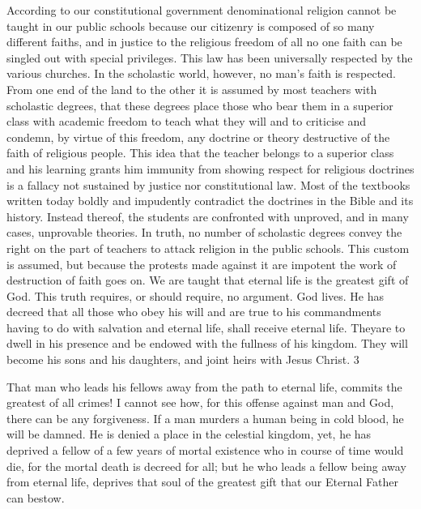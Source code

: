 According to our constitutional government denominational religion cannot be taught in our
public schools because our citizenry is composed of so many different faiths, and in justice to
the religious freedom of all no one faith can be singled out with special privileges. This law
has been universally respected by the various churches. In the scholastic world, however, no
man's faith is respected. From one end of the land to the other it is assumed by most teachers
with scholastic degrees, that these degrees place those who bear them in a superior class with
academic freedom to teach what they will and to criticise and condemn, by virtue of this
freedom, any doctrine or theory destructive of the faith of religious people. This idea that the
teacher belongs to a superior class and his learning grants him immunity from showing
respect for religious doctrines is a fallacy not sustained by justice nor constitutional law.
Most of the textbooks written today boldly and impudently contradict the doctrines in the
Bible and its history. Instead thereof, the students are confronted with unproved, and in many
cases, unprovable theories. In truth, no number of scholastic degrees convey the right on the
part of teachers to attack religion in the public schools. This custom is assumed, but because
the protests made against it are impotent the work of destruction of faith goes on. We are
taught that eternal life is the greatest gift of God. This truth requires, or should require, no
argument. God lives. He has decreed that all those who obey his will and are true to his
commandments having to do with salvation and eternal life, shall receive eternal life. Theyare to dwell in his presence and be endowed with the fullness of his kingdom. They will
become his sons and his daughters, and joint heirs with Jesus Christ. 3

That man who leads his fellows away from the path to eternal life, commits the greatest of all
crimes! I cannot see how, for this offense against man and God, there can be any forgiveness.
If a man murders a human being in cold blood, he will be damned. He is denied a place in the
celestial kingdom, yet, he has deprived a fellow of a few years of mortal existence who in
course of time would die, for the mortal death is decreed for all; but he who leads a fellow
being away from eternal life, deprives that soul of the greatest gift that our Eternal Father can
bestow.

